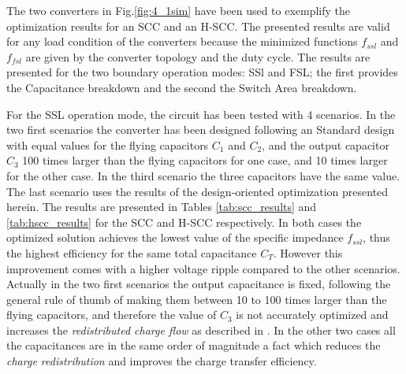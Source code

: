 The two converters in Fig.\ref{fig:4_1sim} have been used to exemplify the optimization results for an SCC and an H-SCC. The presented results are valid for any load condition of the converters because the minimized functions $f_{ssl}$ and $f_{fsl}$  are given by the converter topology and the duty cycle. The results are presented for the two boundary operation modes: SSl and FSL; the first provides the Capacitance breakdown and the second the Switch Area breakdown.

For the SSL operation mode, the circuit has been tested with 4 scenarios. In the two first scenarios the converter has been designed following an Standard design with equal values for the flying capacitors $C_1$ and $C_2$, and the output capacitor $C_3$ 100 times larger than the flying capacitors for one case, and 10 times larger for the other case. In the third scenario the three capacitors have the same value. The last scenario uses the results of the design-oriented optimization presented herein. The results are presented in Tables \ref{tab:scc_results} and \ref{tab:hscc_results} for the SCC and H-SCC respectively. In both cases the optimized solution achieves the lowest value of the specific impedance $f_{ssl}$, thus the highest efficiency for the same total capacitance $C_T$. However this improvement  comes with a higher voltage ripple compared to the other scenarios. Actually in the two first scenarios the output capacitance is fixed, following the general rule of thumb of making them between 10 to 100 times larger than the flying capacitors, and therefore the value of $C_3$ is not accurately optimized and increases the \emph{redistributed charge flow} as described in \cite{Steyaert13}. In the other two cases all the capacitances are in the same order of magnitude a fact which reduces the \emph{charge redistribution} and improves the charge transfer efficiency.


